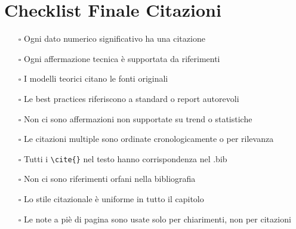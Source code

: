 \documentclass{article}
\begin{document}
\section*{Checklist Finale Citazioni}

\begin{tcolorbox}[colback=yellow!10!white,colframe=red!50!black,title=\textbf{Verifica Pre-Consegna}]
\begin{enumerate}
    \item[$\square$] Ogni dato numerico significativo ha una citazione
    \item[$\square$] Ogni affermazione tecnica è supportata da riferimenti
    \item[$\square$] I modelli teorici citano le fonti originali
    \item[$\square$] Le best practices riferiscono a standard o report autorevoli
    \item[$\square$] Non ci sono affermazioni non supportate su trend o statistiche
    \item[$\square$] Le citazioni multiple sono ordinate cronologicamente o per rilevanza
    \item[$\square$] Tutti i \texttt{\textbackslash cite\{\}} nel testo hanno corrispondenza nel .bib
    \item[$\square$] Non ci sono riferimenti orfani nella bibliografia
    \item[$\square$] Lo stile citazionale è uniforme in tutto il capitolo
    \item[$\square$] Le note a piè di pagina sono usate solo per chiarimenti, non per citazioni
\end{enumerate}
\end{tcolorbox}
\end{document}
